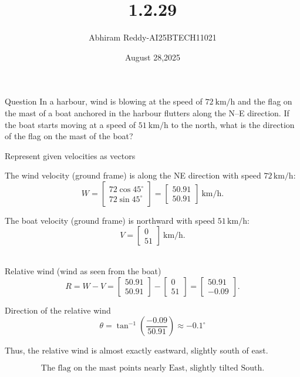 \documentclass{beamer}
\title 
{1.2.29}
\date{August 28,2025}
\author 
{Abhiram Reddy-AI25BTECH11021}
\begin{document}
\frame{\titlepage}
\begin{frame}{Question}
In a harbour, wind is blowing at the speed of $72\ \mathrm{km/h}$ and the flag on the mast of a boat anchored in the harbour flutters along the N--E direction. If the boat starts moving at a speed of $51\ \mathrm{km/h}$ to the north, what is the direction of the flag on the mast of the boat?
\end{frame}



\begin{frame}{Represent given velocities as vectors}

The wind velocity (ground frame) is along the NE direction with speed $72 \,\text{km/h}$:
\[
W = \begin{bmatrix} 72 \cos 45^\circ \\ 72 \sin 45^\circ \end{bmatrix}
= \begin{bmatrix} 50.91 \\ 50.91 \end{bmatrix} \ \text{km/h}.
\]

The boat velocity (ground frame) is northward with speed $51 \,\text{km/h}$:
\[
V = \begin{bmatrix} 0 \\ 51 \end{bmatrix} \ \text{km/h}.
\]\\

\end{frame}

\begin{frame}{Relative wind (wind as seen from the boat)}
\[
R = W - V
= \begin{bmatrix} 50.91 \\ 50.91 \end{bmatrix} -
\begin{bmatrix} 0 \\ 51 \end{bmatrix}
= \begin{bmatrix} 50.91 \\ -0.09 \end{bmatrix}.
\]
\end{frame}
\begin{frame}{Direction of the relative wind}
\[
\theta = \tan^{-1}\left(\frac{-0.09}{50.91}\right) \approx -0.1^\circ
\]

Thus, the relative wind is almost exactly eastward, slightly south of east.

\[
\boxed{\text{The flag on the mast points nearly East, slightly tilted South.}}
\]
\end{frame}
\end{document}
